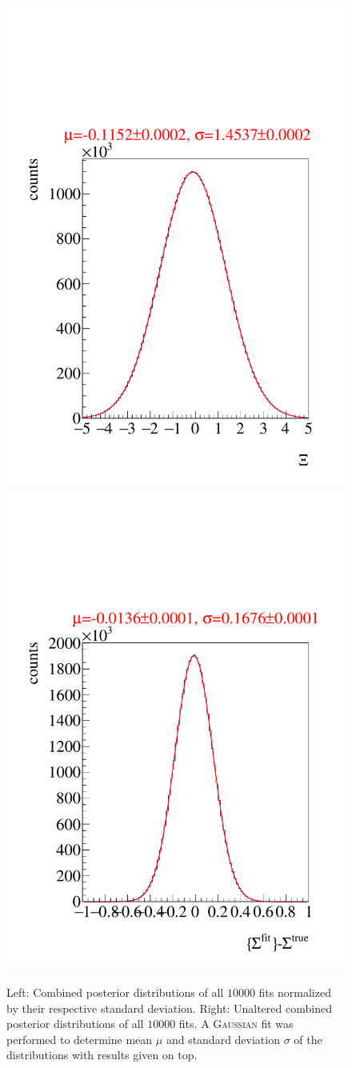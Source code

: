 \begin{figure}[htbp]
	\centering
	\includegraphics[width=.49\linewidth]{../bayes/toyMC/plots/combined_post_add.pdf}
	\includegraphics[width=.49\linewidth]{../bayes/toyMC/plots/combined_post_add_raw.pdf}
	\caption{Left: Combined posterior distributions of all $10000$ fits normalized by their respective standard deviation. Right: Unaltered combined posterior distributions of all $10000$ fits. A \textsc{Gaussian} fit was performed to determine mean $\mu$ and standard deviation $\sigma$ of the distributions with results given on top.}
	\label{fig:toymcpost}
\end{figure}
